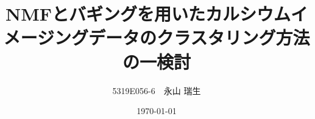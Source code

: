 \documentclass[
  twoside, %
  numbers=noenddot, %
  headsepline, %
  footsepline, %
]{scrbook}
\title{NMFとバギングを用いたカルシウムイメージングデータのクラスタリング方法の一検討}
\author{5319E056-6　永山 瑞生}
\date{\today}
\begin{document}
\frontmatter
\maketitle

\tableofcontents

\mainmatter









\backmatter
\begin{otherlanguage}{english}
  \printbibliography[title=参考文献]
\end{otherlanguage}



\end{document}
